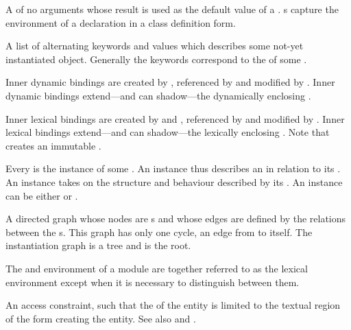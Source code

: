 \begin{optDefinition}
\begin{definitions}
      A
     of no arguments whose result is used as the default value of a
    .  s capture the  environment
    of a  declaration in a class definition form.

      A list of alternating
    keywords and values which describes some not-yet instantiated object.
    Generally the keywords correspond to the  of some .

     Inner dynamic
    bindings are created by , referenced by
     and modified by .  Inner dynamic
    bindings extend---and can shadow---the dynamically enclosing .

     Inner lexical
    bindings are created by  and ,
    referenced by  and modified by .  Inner
    lexical bindings extend---and can shadow---the lexically enclosing
    .  Note that  creates an immutable
    .

      Every  is the
    instance of some .  An instance thus describes an 
    in relation to its .  An instance takes on the structure and
    behaviour described by its .  An instance can be either
     or .

      A
    directed graph whose nodes are s and whose edges are defined
    by the  relations between the s.  This graph has
    only one cycle, an edge from  to itself.  The instantiation
    graph is a tree and  is the root.

     The
     and  environment of a module are together
    referred to as the lexical environment except when it is necessary to
    distinguish between them.

     An access
    constraint, such that the  of the entity is limited to the
    textual region of the form creating the entity.  See also  and .


\end{definitions}
\end{optDefinition}
